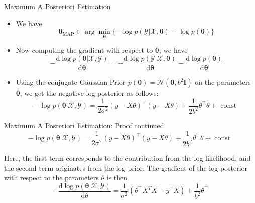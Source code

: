 \documentclass{beamer}
\begin{document}
\begin{frame}{Maximum A Posteriori Estimation}
\begin{itemize}[<+->]
\item We have 
\begin{equation*}
\boldsymbol{\theta}_{\mathrm{MAP}} \in \arg \min _{\boldsymbol{\theta}}\{-\log p(\mathcal{Y} | \mathcal { X }, \boldsymbol{\theta})-\log p(\boldsymbol{\theta})\}
\end{equation*}
\item Now computing the gradient with respect to $\boldsymbol{\theta}$, we have 
\begin{equation*}
-\frac{\mathrm{d} \log p(\boldsymbol{\theta} | \mathcal{X}, \mathcal{Y})}{\mathrm{d} \boldsymbol{\theta}}=-\frac{\mathrm{d} \log p(\mathcal{Y} | \mathcal{X}, \boldsymbol{\theta})}{\mathrm{d} \boldsymbol{\theta}}-\frac{\mathrm{d} \log p(\boldsymbol{\theta})}{\mathrm{d} \boldsymbol{\theta}}
\end{equation*}
\item Using the conjugate Gaussian Prior $p(\boldsymbol{\theta}) = \mathcal{N}(\boldsymbol{0}, b^{2}\boldsymbol{I})$ on the parameters $\boldsymbol{\theta}$, we get the negative log posterior as follows:
\begin{equation*}
-\log p(\boldsymbol{\theta} | \mathcal{X}, \mathcal{Y})=\frac{1}{2 \sigma^{2}}({y}-{X} {\theta})^{\top}({y}-{X} {\theta})+\frac{1}{2 b^{2}} {\theta}^{\top} {\theta}+\text { const }
\end{equation*}
\end{itemize}


\end{frame}

\begin{frame}{Maximum A Posteriori Estimation: Proof continued}
\begin{equation*}
-\log p(\boldsymbol{\theta} | \mathcal{X}, \mathcal{Y})=\frac{1}{2 \sigma^{2}}({y}-{X} {\theta})^{\top}({y}-{X} {\theta})+\frac{1}{2 b^{2}} {\theta}^{\top} {\theta}+\text { const }
\end{equation*}

Here, the first term corresponds to the contribution from the log-likelihood, and the second term originates from the log-prior. The gradient of the log-posterior with respect to the parameters $\theta$ is then
\begin{equation*}
-\frac{\mathrm{d} \log p(\boldsymbol{\theta} | \mathcal{X}, \mathcal{Y})}{\mathrm{d} {\theta}}=\frac{1}{\sigma^{2}}\left({\theta}^{\top} X^{T}X-{y}^{\top}  X \right)+\frac{1}{b^{2}} {\theta}^{\top}
\end{equation*}

\end{frame}
\end{document}
